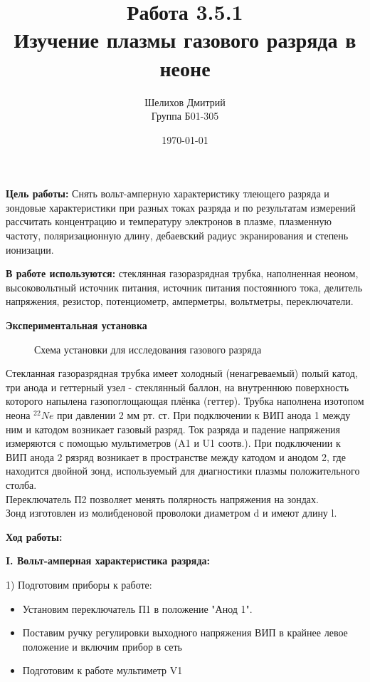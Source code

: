 \documentclass[a4paper,12pt]{article}
\author{Шелихов Дмитрий\\Группа Б01-305}
\title{\textbf{Работа 3.5.1\\Изучение плазмы газового разряда в неоне}}
\date{\today}
\begin{document}
 

\maketitle

\par\textbf{Цель работы: }Снять вольт-амперную характеристику тлеющего разряда и зондовые характеристики при разных токах разряда и по результатам измерений рассчитать концентрацию и температуру электронов в плазме, плазменную частоту, поляризационную длину, дебаевский радиус экранирования и степень ионизации.

\par\textbf{В работе используются: } стеклянная газоразрядная трубка, наполненная неоном, высоковольтный источник питания, источник питания постоянного тока, делитель напряжения, резистор, потенциометр, амперметры, вольтметры, переключатели. 

\par\textbf{Экспериментальная установка}

\begin{figure}[htp]
\caption{Схема установки для исследования газового разряда}
\end{figure}

Стекланная газоразрядная трубка имеет холодный (ненагреваемый) полый катод, три анода и геттерный узел - стеклянный баллон, на внутреннюю поверхность которого напылена газопоглощающая плёнка (геттер). Трубка наполнена изотопом неона $^{22}{Ne}$ при давлении 2 мм рт. ст.
При подключении к ВИП анода 1 между ним и катодом возникает газовый разряд. Ток разряда и падение напряжения измеряются с помощью мультиметров (A1 и U1 соотв.).
При подключении к ВИП анода 2 рязряд возникает в пространстве между катодом и анодом 2, где находится двойной зонд, используемый для диагностики плазмы положительного столба. \\

Переключатель П2 позволяет менять полярность напряжения на зондах. \\

Зонд изготовлен из молибденовой проволоки диаметром d и имеют длину l. 

\par\textbf{Ход работы:}
\par\textbf{I. Вольт-амперная характеристика разряда:}
\par1) Подготовим приборы к работе:
\begin{itemize}
\item Установим переключатель П1 в положение "Анод 1".
\item Поставим ручку регулировки выходного напряжения ВИП в крайнее левое положение и включим прибор в сеть 
\item Подготовим к работе мультиметр V1 
\end{itemize}
\end{document}
